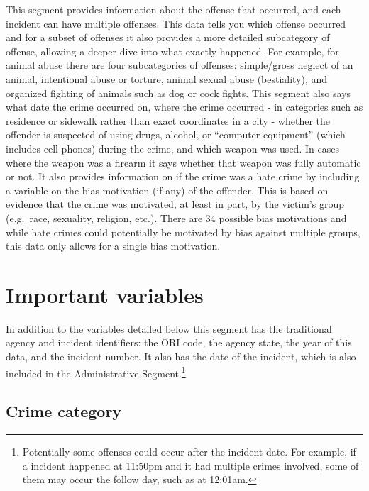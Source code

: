 \documentclass[
  12pt,
  openany]{book}
\begin{document}
This segment provides information about the offense that occurred, and each incident can have multiple offenses. This data tells you which offense occurred and for a subset of offenses it also provides a more detailed subcategory of offense, allowing a deeper dive into what exactly happened. For example, for animal abuse there are four subcategories of offenses: simple/gross neglect of an animal, intentional abuse or torture, animal sexual abuse (bestiality), and organized fighting of animals such as dog or cock fights. This segment also says what date the crime occurred on, where the crime occurred - in categories such as residence or sidewalk rather than exact coordinates in a city - whether the offender is suspected of using drugs, alcohol, or ``computer equipment'' (which includes cell phones) during the crime, and which weapon was used. In cases where the weapon was a firearm it says whether that weapon was fully automatic or not. It also provides information on if the crime was a hate crime by including a variable on the bias motivation (if any) of the offender. This is based on evidence that the crime was motivated, at least in part, by the victim's group (e.g.~race, sexuality, religion, etc.). There are 34 possible bias motivations and while hate crimes could potentially be motivated by bias against multiple groups, this data only allows for a single bias motivation.

\hypertarget{important-variables-1}{%
\section{Important variables}\label{important-variables-1}}

In addition to the variables detailed below this segment has the traditional agency and incident identifiers: the ORI code, the agency state, the year of this data, and the incident number. It also has the date of the incident, which is also included in the Administrative Segment.\footnote{Potentially some offenses could occur after the incident date. For example, if a incident happened at 11:50pm and it had multiple crimes involved, some of them may occur the follow day, such as at 12:01am.}

\hypertarget{crime-category}{%
\subsection{Crime category}\label{crime-category}}
\end{document}
